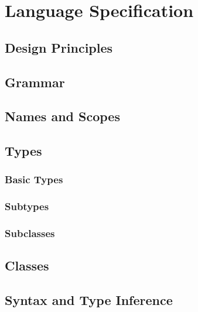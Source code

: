 \part{Language Specification}
\chapter{Design Principles}

\chapter{Grammar}

\chapter{Names and Scopes}

\chapter{Types}
\section{Basic Types}
\section{Subtypes}
\section{Subclasses}

\chapter{Classes}

\chapter{Syntax and Type Inference}
